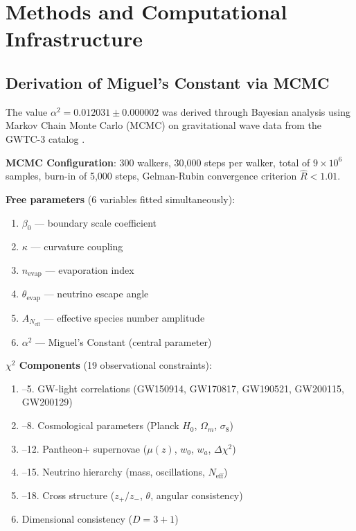 \documentclass[12pt,a4paper,twoside]{article}
\newcommand{\alphaii}{\alpha^{2}}
\begin{document}
\section{Methods and Computational Infrastructure}


\subsection{Derivation of Miguel's Constant via MCMC}

The value $\alphaii = 0.012031 \pm 0.000002$ was derived through Bayesian analysis using Markov Chain Monte Carlo (MCMC) on gravitational wave data from the GWTC-3 catalog \cite{GWTC3}.

\textbf{MCMC Configuration}: 300 walkers, 30,000 steps per walker, total of $9 \times 10^6$ samples, burn-in of 5,000 steps, Gelman-Rubin convergence criterion $\hat{R} < 1.01$.

\textbf{Free parameters} (6 variables fitted simultaneously):
\begin{enumerate}[nosep]
\item $\beta_0$ --- boundary scale coefficient
\item $\kappa$ --- curvature coupling
\item $n_{\text{evap}}$ --- evaporation index
\item $\theta_{\text{evap}}$ --- neutrino escape angle
\item $A_{N_{\text{eff}}}$ --- effective species number amplitude
\item $\alphaii$ --- Miguel's Constant (central parameter)
\end{enumerate}

\textbf{$\chi^2$ Components} (19 observational constraints):
\begin{enumerate}[nosep]
\item--5. GW-light correlations (GW150914, GW170817, GW190521, GW200115, GW200129)
\item--8. Cosmological parameters (Planck $H_0$, $\Omega_m$, $\sigma_8$)
\item--12. Pantheon+ supernovae ($\mu(z)$, $w_0$, $w_a$, $\Delta\chi^2$)
\item--15. Neutrino hierarchy (mass, oscillations, $N_{\text{eff}}$)
\item--18. Cross structure ($z_+/z_-$, $\theta$, angular consistency)
\item Dimensional consistency ($D = 3 + 1$)
\end{enumerate}
\end{document}
